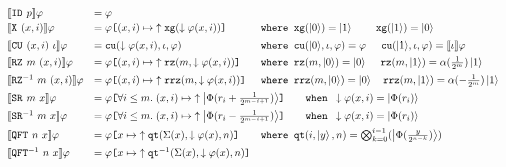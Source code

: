 \begin{figure}[t]
{\footnotesize
\[
\begin{array}{lll}
\llbracket \iskip{p} \rrbracket\varphi &= \varphi\\[0.2em]

\llbracket \inot{(x, i)} \rrbracket\varphi &= \app{\uparrow\xsem(\downarrow\varphi(x,i))}{\varphi}{(x,i)}
& \texttt{where  }\xsem(\ket{0})=\ket{1} \qquad\, \xsem(\ket{1})=\ket{0}
\\[0.5em]

\llbracket \ictrl{(x,i)}{\instr} \rrbracket\varphi &=  \csem(\downarrow\varphi(x,i),\instr,\varphi)
&
\texttt{where  }
\csem({\ket{0}},{\instr},\varphi)=\varphi\quad\;\,
\csem({\ket{1}},{\instr},\varphi)=\llbracket \instr \rrbracket\varphi
\\[0.4em]

\llbracket \irz{m}{(x,i)} \rrbracket\varphi &= \app{\uparrow {\rsem}({m},\downarrow\varphi(x,i))}{\varphi}{(x,i)}
&\texttt{where  }{\rsem}(m,\ket{0})=\ket{0} \; \quad{\rsem}(m,\ket{1})=\alpha(\frac{1}{2^m})\ket{1}
\\[0.5em]

\llbracket \irz[-1]{m}{(x,i)} \rrbracket\varphi &= \app{\uparrow {\rrsem}({m},\downarrow\varphi(x,i))}{\varphi}{(x,i)}
 &\texttt{where  }{\rrsem}(m,\ket{0})=\ket{0}
\quad{\rrsem}(m,\ket{1})=\alpha(-\frac{1}{2^m})\ket{1}
\\[0.5em]

\llbracket \isr{m}{x} \rrbracket\varphi &
                                            \multicolumn{2}{l}{= \app{\uparrow \qket{r_i+\frac{1}{2^{m-i+1}}}}{\varphi}{\forall i \le m.\;(x,i)}
\qquad \texttt{when  }
\downarrow\varphi(x,i) = \qket{r_i}}\\[0.5em]

\llbracket \isr[-1]{m}{x} \rrbracket\varphi&\multicolumn{2}{l}{= \app{\uparrow \qket{r_i-\frac{1}{2^{m-i+1}}}}{\varphi}{\forall i \le m.\;(x,i)}
\qquad \texttt{when  }
\downarrow\varphi(x,i) = \qket{r_i}}\\[0.5em]

\llbracket \iqft{n}{x} \rrbracket\varphi &= \app{\uparrow\qsem(\Sigma(x),\downarrow\varphi(x),n)}{\varphi}{x}
& \texttt{where  }\qsem(i,\ket{y},n)=\bigotimes_{k=0}^{i-1}(\qket{\frac{y}{2^{n-k}}})
\\[0.5em]

\llbracket \iqft[-1]{n}{x} \rrbracket\varphi &=  \app{\uparrow\qsem^{-1}(\Sigma(x),\downarrow\varphi(x),n)}{\varphi}{x}
\\[0.5em]


\end{array}\]}
\end{figure}
